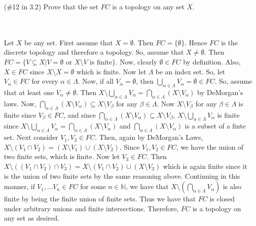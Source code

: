 (\#12 in 3.2) Prove that the set $FC$ is a topology on any set $X$.\\\\

\begin{solution}\renewcommand{\qedsymbol}{}\ \\
    Let $X$ be any set. First assume that $X=\emptyset$. Then $FC=\{\emptyset\}$. Hence $FC$ is the
    discrete topology and therefore a topology. So, assume that $X\neq\emptyset$. Then
    $FC=\{V\subseteq X|V=\emptyset$ or $X\setminus V$ is finite$\}$. Now, clearly $\emptyset\in FC$ by
    definition. Also, $X\in FC$ since $X\setminus X=\emptyset$ which is finite. Now let $\Lambda$ be an
    index set. So, let $V_{\alpha}\in FC$ for every $\alpha\in\Lambda$. Now, if all
    $V_{\alpha}=\emptyset$, then $\bigcup_{\alpha\in\Lambda}V_{\alpha}=\emptyset\in FC$. So, assume that
    at least one $V_{\alpha}\neq\emptyset$. Then
    $X\setminus\bigcup_{\alpha\in\Lambda}V_{\alpha}=\bigcap_{\alpha\in\Lambda}(X\setminus V_{\alpha})$
    by DeMorgan's laws. Now,
    $\bigcap_{\alpha\in\Lambda}(X\setminus V_{\alpha})\subseteq X\setminus V_{\beta}$ for any
    $\beta\in\Lambda$. Now $X\setminus V_{\beta}$ for any $\beta\in\Lambda$ is finite since
    $V_{\beta}\in FC$, and since
    $\bigcap_{\alpha\in\Lambda}(X\setminus V_{\alpha})\subseteq X\setminus V_{\beta}$,
    $X\setminus\bigcup_{\alpha\in\Lambda}V_{\alpha}$ is finite since
    $X\setminus\bigcup_{\alpha\in\Lambda}V_{\alpha}=\bigcap_{\alpha\in\Lambda}(X\setminus V_{\alpha})$
    and $\bigcap_{\alpha\in\Lambda}(X\setminus V_{\alpha})$ is a subset of a finte set. Next consider
    $V_1,V_2\in FC$. Then, again by DeMorgan's Laws,
    $X\setminus(V_1\cap V_2)=(X\setminus V_1)\cup(X\setminus V_2)$. Since $V_1,V_2\in FC$, we have the
    union of two finite sets, which is finite. Now let $V_3\in FC$. Then
    $X\setminus((V_1\cap V_2)\cap V_3)=X\setminus(V_1\cap V_2)\cup(X\setminus V_3)$ which is again
    finite since it is the union of two finite sets by the same reasoning above. Continuing in this
    manner, if $V_1,\ldots V_n\in FC$ for some $n\in\mathbb{N}$, we have that
    $X\setminus(\bigcap_{\alpha\in\Lambda}V_{\alpha})$ is also finite by being the finite union of
    finite sets. Thus we have that $FC$ is closed under arbitrary unions and finite intersections.
    Therefore, $FC$ is a topology on any set as desired.

\end{solution}